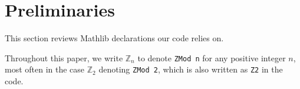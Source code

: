 \section{Preliminaries}

This section reviews Mathlib declarations our code relies on.

Throughout this paper, we write $\mathbb{Z}_{n}$ to denote \texttt{ZMod n} for any positive integer $n$, most often in the case $\mathbb{Z}_{2}$ denoting \texttt{ZMod 2}, which is also written as \texttt{Z2} in the code.






